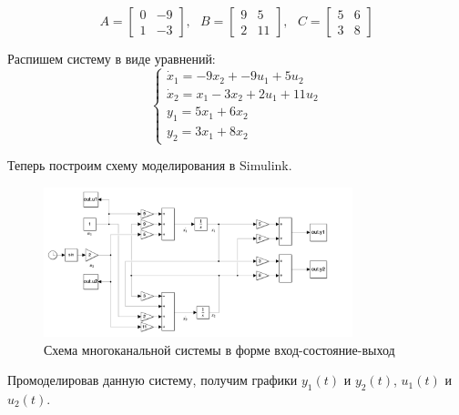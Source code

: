 \begin{equation}
    A = \begin{bmatrix}
        0 & -9 \\
        1 & -3
    \end{bmatrix},~~~
    B = \begin{bmatrix}
        9 & 5 \\
        2 & 11
    \end{bmatrix},~~~
    C = \begin{bmatrix}
        5 & 6 \\
        3 & 8
    \end{bmatrix}
\end{equation}

Распишем систему в виде уравнений:
\begin{equation}
    \begin{cases}
        \dot{x}_1 = -9x_2 + -9u_1 + 5u_2 \\
        \dot{x}_2 = x_1 - 3x_2 + 2u_1 + 11u_2 \\
        y_1 = 5x_1 + 6x_2 \\
        y_2 = 3x_1 + 8x_2
    \end{cases}
\end{equation}

Теперь построим схему моделирования в Simulink.

\begin{figure}[ht!]
    \centering
    \includegraphics[width=0.8\textwidth]{media/system6.png}
    \caption{Схема многоканальной системы в форме вход-состояние-выход}
    \label{fig:model6}
\end{figure}

Промоделировав данную систему, получим графики $y_1(t)$ и $y_2(t)$, $u_1(t)$ и $u_2(t)$.

